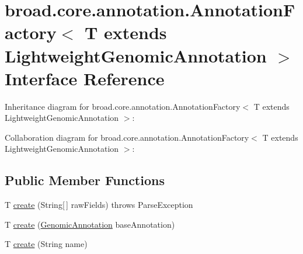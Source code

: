\hypertarget{interfacebroad_1_1core_1_1annotation_1_1_annotation_factory_3_01_t_01extends_01_lightweight_genomic_annotation_01_4}{\section{broad.\+core.\+annotation.\+Annotation\+Factory$<$ T extends Lightweight\+Genomic\+Annotation $>$ Interface Reference}
\label{interfacebroad_1_1core_1_1annotation_1_1_annotation_factory_3_01_t_01extends_01_lightweight_genomic_annotation_01_4}
}


Inheritance diagram for broad.\+core.\+annotation.\+Annotation\+Factory$<$ T extends Lightweight\+Genomic\+Annotation $>$\+:


Collaboration diagram for broad.\+core.\+annotation.\+Annotation\+Factory$<$ T extends Lightweight\+Genomic\+Annotation $>$\+:
\subsection*{Public Member Functions}
\begin{DoxyCompactItemize}
\item 
T \hyperlink{interfacebroad_1_1core_1_1annotation_1_1_annotation_factory_3_01_t_01extends_01_lightweight_genomic_annotation_01_4_a19a970c5d2fc3ce13340ad5afb57bde3}{create} (String\mbox{[}$\,$\mbox{]} raw\+Fields)  throws Parse\+Exception
\item 
T \hyperlink{interfacebroad_1_1core_1_1annotation_1_1_annotation_factory_3_01_t_01extends_01_lightweight_genomic_annotation_01_4_a34914aa67623922c30e7e456ee7d2415}{create} (\hyperlink{interfacebroad_1_1core_1_1annotation_1_1_genomic_annotation}{Genomic\+Annotation} base\+Annotation)
\item 
T \hyperlink{interfacebroad_1_1core_1_1annotation_1_1_annotation_factory_3_01_t_01extends_01_lightweight_genomic_annotation_01_4_a4e32d8dd88014e51b3765f45afca5cdb}{create} (String name)
\end{DoxyCompactItemize}


